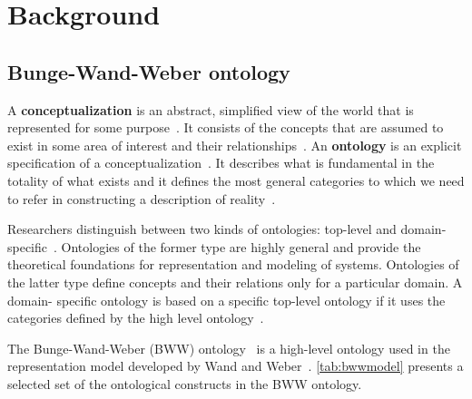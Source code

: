 \chapter{Background}
\label{sec:background}

\section{Bunge-Wand-Weber ontology}

A \textbf{conceptualization} is an abstract, simplified view of the world that is represented for
some purpose~\cite{gruber1995toward}. It consists of the concepts that are assumed to exist in some
area of interest and their relationships~\cite{gruber1995toward}. An \textbf{ontology} is an
explicit specification of a conceptualization~\cite{gruber1995toward}. It describes what is
fundamental in the totality of what exists and it defines the most general categories to which we
need to refer in constructing a description of reality~\cite{milton2004top}.

Researchers distinguish between two kinds of ontologies: top-level and domain-
specific~\cite{milton2004top}. Ontologies of the former type are highly general and provide the
theoretical foundations for representation and modeling of systems. Ontologies of the latter type
define concepts and their relations only for a particular domain. A domain- specific ontology is
based on a specific top-level ontology if it uses the categories defined by the high level
ontology~\cite{milton2004top}.

The Bunge-Wand-Weber (BWW) ontology~\cite{wand1990ontological} is a high-level ontology used in the
representation model developed by Wand and Weber~\cite{wand1995deep}. \autoref{tab:bwwmodel}
presents a selected set of the ontological constructs in the BWW ontology.

